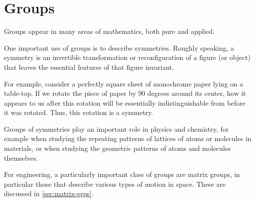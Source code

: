 
\section{Groups}
\label{sec:groups}

Groups appear in many areas of mathematics, both pure and applied.

One important use of groups is to describe symmetries.
Roughly speaking, a symmetry is an invertible transformation or reconfiguration of a figure (or object) that leaves the essential features of that figure invariant.

For example, consider a perfectly square sheet of monochrome paper lying on a table-top.
If we rotate the piece of paper by 90 degrees around its center, how it appears to us after this rotation will be essentially indistinguishable from before it was rotated.
Thus, this rotation is a symmetry.

Groups of symmetries play an important role in physics and chemistry, for example when studying the repeating patterns of lattices of atoms or molecules in materials, or when studying the geometric patterns of atoms and molecules themselves.

For engineering, a particularly important class of groups are matrix groups, in particular those that describe various types of motion in space.
These are discussed in \cref{sec:matrix-grps}.

